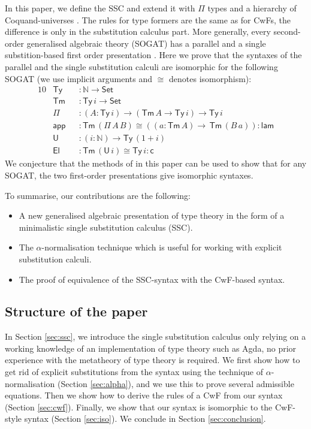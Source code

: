 \documentclass[sigplan,10pt,anonymous,review]{acmart}\settopmatter{printfolios=true,printccs=false,printacmref=false}
\newcommand{\ra}{\rightarrow}
\newcommand{\Set}{\mathsf{Set}}
\newcommand{\Ty}{\mathsf{Ty}}
\newcommand{\Tm}{\mathsf{Tm}}
\newcommand{\N}{\mathbb{N}}
\newcommand{\lam}{\mathsf{lam}}
\newcommand{\app}{\mathsf{app}}
\newcommand{\U}{\mathsf{U}}
\newcommand{\El}{\mathsf{El}}
\newcommand{\cd}{\mathsf{c}}
\begin{document}
In this paper, we define the SSC and extend it with
$\Pi$ types and a hierarchy of Coquand-universes
\cite{coquandUniverse}. The rules for type formers are the same as for
CwFs, the difference is only in the substitution calculus part. More
generally, every second-order generalised algebraic theory (SOGAT) has
a parallel and a single substition-based first order presentation
\cite{DBLP:conf/fscd/KaposiX24}. Here we prove that the syntaxes of
the parallel and the single substitution calculi are isomorphic for
the following SOGAT (we use implicit arguments and $\cong$ denotes
isomorphism):
\begin{alignat*}{10}
  & \Ty && : \N\ra\Set \\
  & \Tm && : \Ty\,i\ra\Set \\
  & \Pi && : (A:\Ty\,i)\ra(\Tm\,A\ra\Ty\,i)\ra\Ty\,i \\
  & \app && : \Tm\,(\Pi\,A\,B)\cong((a:\Tm\,A)\ra\,\Tm\,(B\,a)): \lam \\
  & \U && : (i:\N)\ra\Ty\,(1+i) \\
  & \El && : \Tm\,(\U\,i)\cong\Ty\,i : \cd
\end{alignat*}
We conjecture that the methods of in this paper can be used to show
that for any SOGAT, the two first-order presentations give isomorphic
syntaxes.

To summarise, our contributions are the following:
\begin{itemize}
\item A new generalised algebraic presentation of type theory in the
  form of a minimalistic single substitution calculus (SSC).
\item The $\alpha$-normalisation technique which is useful for working
  with explicit substitution calculi.
\item The proof of equivalence of the SSC-syntax with the CwF-based
  syntax.
\end{itemize}

\subsection{Structure of the paper}

In Section \ref{sec:ssc}, we introduce the single substitution
calculus only relying on a working knowledge of an implementation of
type theory such as Agda, no prior experience with the metatheory of
type theory is required. We first show how to get rid of explicit
substitutions from the syntax using the technique of
$\alpha$-normalisation (Section \ref{sec:alpha}), and we use this to
prove several admissible equations. Then we show how to derive the
rules of a CwF from our syntax (Section \ref{sec:cwf}). Finally, we
show that our syntax is isomorphic to the CwF-style syntax (Section
\ref{sec:iso}). We conclude in Section \ref{sec:conclusion}.
\end{document}
